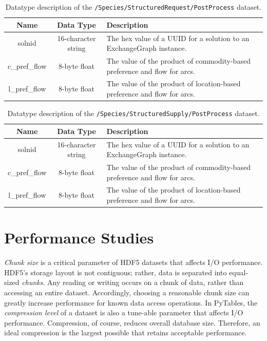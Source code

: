 \begin{table}[h!]
\centering
\label{tbl:/Species/StructuredRequest/PostProcess}
\caption{Datatype description of the \lstinline[basicstyle=\ttfamily\color{black}]|/Species/StructuredRequest/PostProcess| dataset.}
\begin{tabularx}{\columnwidth-10pt}{|c|c|X|} %
\hline
\textbf{Name} & \textbf{Data Type} & \textbf{Description}       \\ \hline
solnid & 16-character string & The hex value of a UUID for a solution to an ExchangeGraph instance. \\ \hline
c\_pref\_flow & 8-byte float & The value of the product of commodity-based preference and flow for arcs. \\ \hline
l\_pref\_flow & 8-byte float & The value of the product of location-based preference and flow for arcs. \\ \hline
\end{tabularx}
\end{table}

\begin{table}[h!]
\centering
\caption{
\label{tbl:/Species/StructuredSupply/PostProcess}
Datatype description of the \lstinline[basicstyle=\ttfamily\color{black}]|/Species/StructuredSupply/PostProcess| dataset.}
\begin{tabularx}{\columnwidth-10pt}{|c|c|X|} %
\hline
\textbf{Name} & \textbf{Data Type} & \textbf{Description}       \\ \hline
solnid & 16-character string & The hex value of a UUID for a solution to an ExchangeGraph instance. \\ \hline
c\_pref\_flow & 8-byte float & The value of the product of commodity-based preference and flow for arcs. \\ \hline
l\_pref\_flow & 8-byte float & The value of the product of location-based preference and flow for arcs. \\ \hline
\end{tabularx}
\end{table}

\section{Performance Studies}\label{method:tools:hdf5:study}

\textit{Chunk size} is a critical parameter of HDF5 datasets that affects I/O
performance. HDF5's storage layout is not contiguous; rather, data is separated
into equal-sized \textit{chunks}. Any reading or writing occurs on a chunk of
data, rather than accessing an entire dataset. Accordingly, choosing a reasonable
chunk size can greatly increase performance for known data access operations. In
PyTables, the \textit{compression level} of a dataset is also a tune-able
parameter that affects I/O performance. Compression, of course, reduces overall
database size. Therefore, an ideal compression is the largest possible that
retains acceptable performance.

